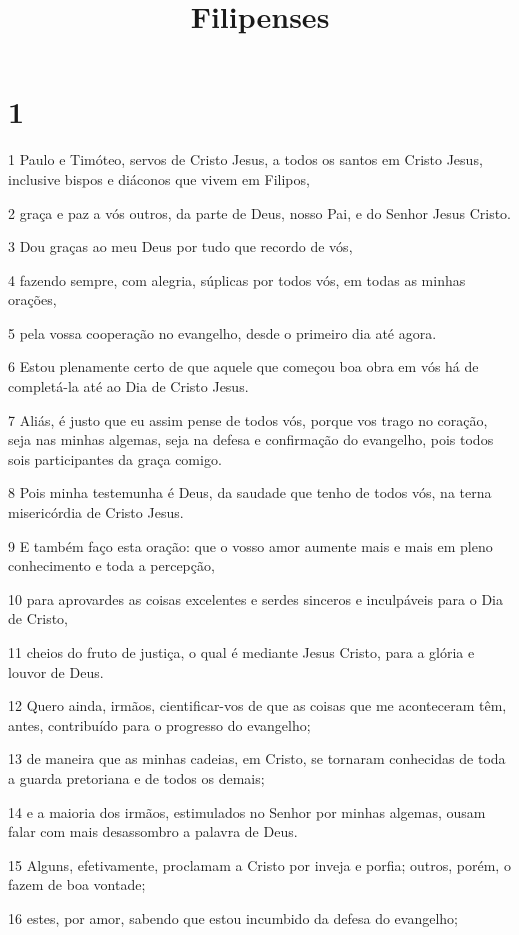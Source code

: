 

\title{Filipenses}


\chapter{1}

\par 1 Paulo e Timóteo, servos de Cristo Jesus, a todos os santos em Cristo Jesus, inclusive bispos e diáconos que vivem em Filipos,
\par 2 graça e paz a vós outros, da parte de Deus, nosso Pai, e do Senhor Jesus Cristo.
\par 3 Dou graças ao meu Deus por tudo que recordo de vós,
\par 4 fazendo sempre, com alegria, súplicas por todos vós, em todas as minhas orações,
\par 5 pela vossa cooperação no evangelho, desde o primeiro dia até agora.
\par 6 Estou plenamente certo de que aquele que começou boa obra em vós há de completá-la até ao Dia de Cristo Jesus.
\par 7 Aliás, é justo que eu assim pense de todos vós, porque vos trago no coração, seja nas minhas algemas, seja na defesa e confirmação do evangelho, pois todos sois participantes da graça comigo.
\par 8 Pois minha testemunha é Deus, da saudade que tenho de todos vós, na terna misericórdia de Cristo Jesus.
\par 9 E também faço esta oração: que o vosso amor aumente mais e mais em pleno conhecimento e toda a percepção,
\par 10 para aprovardes as coisas excelentes e serdes sinceros e inculpáveis para o Dia de Cristo,
\par 11 cheios do fruto de justiça, o qual é mediante Jesus Cristo, para a glória e louvor de Deus.
\par 12 Quero ainda, irmãos, cientificar-vos de que as coisas que me aconteceram têm, antes, contribuído para o progresso do evangelho;
\par 13 de maneira que as minhas cadeias, em Cristo, se tornaram conhecidas de toda a guarda pretoriana e de todos os demais;
\par 14 e a maioria dos irmãos, estimulados no Senhor por minhas algemas, ousam falar com mais desassombro a palavra de Deus.
\par 15 Alguns, efetivamente, proclamam a Cristo por inveja e porfia; outros, porém, o fazem de boa vontade;
\par 16 estes, por amor, sabendo que estou incumbido da defesa do evangelho;
